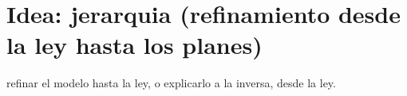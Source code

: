 \section{Idea: jerarquia (refinamiento desde la ley hasta los planes)}
refinar el modelo hasta la ley, o explicarlo a la inversa, desde la ley.